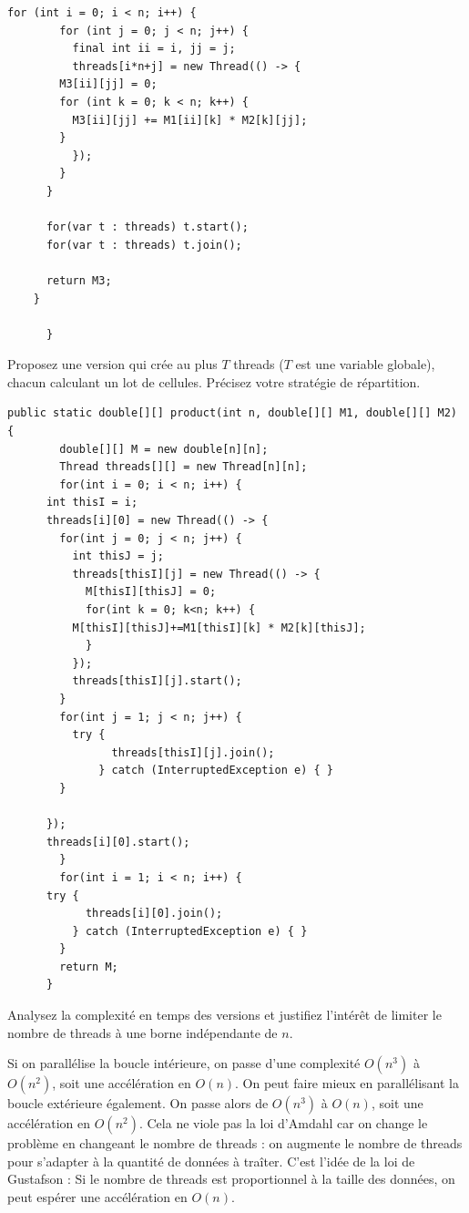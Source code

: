 \begin{exercice}[Parallélisation]
\begin{correction}
\begin{lstlisting}[gobble=6]
	  for (int i = 0; i < n; i++) {
	    for (int j = 0; j < n; j++) {
	      final int ii = i, jj = j;
	      threads[i*n+j] = new Thread(() -> {
		M3[ii][jj] = 0;
		for (int k = 0; k < n; k++) {
		  M3[ii][jj] += M1[ii][k] * M2[k][jj];
		}
	      });
	    }
	  }

	  for(var t : threads) t.start();
	  for(var t : threads) t.join();

	  return M3;
	}

      }
    \end{lstlisting}
  \end{correction}

  \begin{question}
  \item Proposez une version qui crée au plus $T$ threads ($T$ est une variable globale), chacun calculant un lot de cellules.
    Précisez votre stratégie de répartition.
  \end{question}
  \begin{correction}
    \begin{lstlisting}[gobble=6]
      public static double[][] product(int n, double[][] M1, double[][] M2) {
        double[][] M = new double[n][n];
        Thread threads[][] = new Thread[n][n];
        for(int i = 0; i < n; i++) {
	  int thisI = i;
	  threads[i][0] = new Thread(() -> {
	    for(int j = 0; j < n; j++) {
	      int thisJ = j;
	      threads[thisI][j] = new Thread(() -> {
	        M[thisI][thisJ] = 0;
	        for(int k = 0; k<n; k++) {
		  M[thisI][thisJ]+=M1[thisI][k] * M2[k][thisJ];
	        }
	      });
	      threads[thisI][j].start();
	    }
	    for(int j = 1; j < n; j++) {
	      try {
                threads[thisI][j].join();
              } catch (InterruptedException e) { }
	    }
	    
	  });
	  threads[i][0].start();
        }
        for(int i = 1; i < n; i++) {
	  try {
            threads[i][0].join();
          } catch (InterruptedException e) { }
        }
        return M;
      }
    \end{lstlisting}
  \end{correction}

  \begin{question}
  \item Analysez la complexité en temps des versions et justifiez l'intérêt
    de limiter le nombre de threads à une borne indépendante de $n$.
  \end{question}
  \begin{correction}
    Si on parallélise la boucle intérieure, on passe d'une complexité $O(n^3)$ à $O(n^2)$, soit une accélération en $O(n)$.
    On peut faire mieux en parallélisant la boucle extérieure également. On passe alors de $O(n^3)$ à $O(n)$, soit une accélération en $O(n^2)$.
    Cela ne viole pas la loi d'Amdahl car on change le problème en changeant le nombre de threads :
    on augmente le nombre de threads pour s'adapter à la quantité de données à traîter. C'est l'idée de la loi de Gustafson :
    Si le nombre de threads est proportionnel à la taille des données, on peut espérer une accélération en $O(n)$.
    

\end{correction}
\end{exercice}
